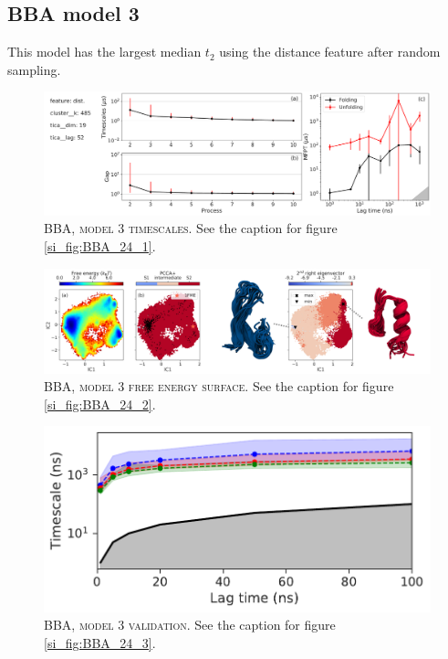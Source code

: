 \documentclass{article}
\begin{document}
\FloatBarrier
\clearpage


\subsection{BBA model 3}

This model has the largest median $t_{2}$ using the distance feature after random sampling. 

\begin{figure}[h]
    \centering
    \includegraphics[width=\columnwidth]{SI_figures/BBA_58_SI-1.pdf}
    \caption{\textsc{BBA, model 3 timescales}. See the caption for figure \ref{si_fig:BBA_24_1}. }
    \label{si_fig:BBA_58_1}
\end{figure}

\begin{figure}[h]
    \centering
    \includegraphics[width=\columnwidth]{SI_figures/BBA_58_SI-2.png}
    \caption{\textsc{BBA, model 3 free energy surface}. See the caption for figure \ref{si_fig:BBA_24_2}. }
    \label{si_fig:BBA_58_2}
\end{figure}

\begin{figure}[h]
    \centering
    \includegraphics[height=0.15\textheight]{SI_figures/BBA_58_its.pdf}
    \caption{\textsc{BBA, model 3 validation}.  See the caption for figure \ref{si_fig:BBA_24_3}.}
    \label{si_fig:BBA_58_3}
\end{figure}
\end{document}
